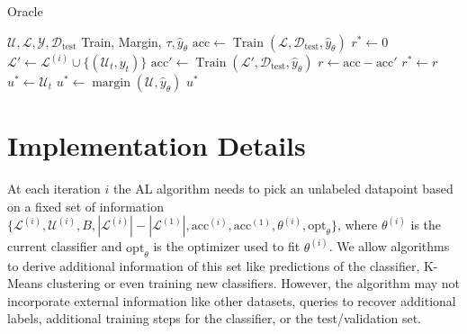 \documentclass[]{article}
\begin{document}
\hspace{2mm}
\begin{minipage}{0.45\linewidth}
	\begin{algorithm}[H]
		\caption{Oracle}\label{alg:oracle}
		\begin{algorithmic}[1]
			\Require $\mathcal{U}, \mathcal{L}, \mathcal{Y}, \mathcal{D}_\text{test}$ Train, Margin, $\tau, \hat y_\theta$ 
			\State $\text{acc} \gets \operatorname{Train}(\mathcal{L}, \mathcal{D}_\text{test}, \hat y_\theta)$ 
			\State $r^* \gets 0$
			\State $\mathcal{L}' \gets \mathcal{L}^{(i)} \cup \{(\mathcal{U}_t, y_t)\}$
			\State $\text{acc}' \gets \operatorname{Train}(\mathcal{L}', \mathcal{D}_\text{test}, \hat y_\theta)$  
			\State $r \gets \text{acc} - \text{acc}'$
			\State $r^* \gets r$
			\State $u^* \gets \mathcal{U}_t$
			\EndIf
			\EndFor
			\State $u^* \gets \operatorname{margin}(\mathcal{U}, \hat y_\theta)$
			\EndIf
			\Return $u^*$
		\end{algorithmic}
	\end{algorithm}
\end{minipage}




\section{Implementation Details}

At each iteration $i$ the AL algorithm needs to pick an unlabeled datapoint based on a fixed set of information $\{\mathcal{L}^{(i)}, \mathcal{U}^{(i)}, B, |\mathcal{L}^{(i)}|-|\mathcal{L}^{(1)}|, \text{acc}^{(i)}, \text{acc}^{(1)}, \theta^{(i)}, \text{opt}_\theta\}$, where $\theta^{(i)}$ is the current classifier and $\text{opt}_\theta$ is the optimizer used to fit $\theta^{(i)}$.
We allow algorithms to derive additional information of this set like predictions of the classifier, K-Means clustering or even training new classifiers.
However, the algorithm may not incorporate external information like other datasets, queries to recover additional labels, additional training steps for the classifier, or the test/validation set.
\end{document}
